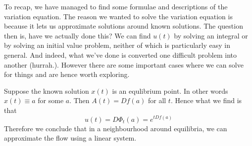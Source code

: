 To recap, we have managed to find some formulae and descriptions of the variation equation. The reason we wanted to solve the variation equation is because it lets us approximate solutions around known solutions. The question then is, have we actually done this? We can find $u(t)$ by solving an integral or by solving an initial value problem, neither of which is particularly easy in general. And indeed, what we've done is converted one difficult problem into another (hurrah.). However there are some important cases where we can solve for things and are hence worth exploring.

Suppose the known solution $x(t)$ is an equlibrium point. In other words $x(t) \equiv a$ for some $a$. Then $A(t) = Df(a)$ for all $t$. Hence what we find is that
$$ u(t) = D\Phi_t(a) = e^{t Df(a)} $$
Therefore we conclude that in a neighbourhood around equilibria, we can approximate the flow using a linear system.